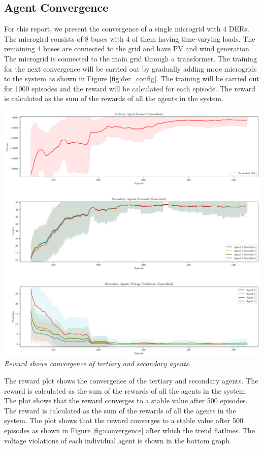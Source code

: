 \documentclass[11pt]{article}
\begin{document}
\subsection{Agent Convergence}
For this report, we present the convergence of a single microgrid with 4 DERs. The microgird consists of 8 buses with 4 of them having time-varying loads. The remaining 4 buses are connected to the grid and have PV and wind generation. The microgrid is connected to the main grid through a transformer.
The training for the next convergence will be carried out by gradually adding more microgrids to the system as shown in Figure \ref{fig:der_config}. The training will be carried out for 1000 episodes and the reward will be calculated for each episode. The reward is calculated as the sum of the rewards of all the agents in the system.

\includegraphics[width=0.9\linewidth]{./rewards_plot.png} 
\label{fig:convergence}
\textit{Reward shows convergence of tertiary and secondary agents.}

The reward plot shows the convergence of the tertiary and secondary agents. The reward is calculated as the sum of the rewards of all the agents in the system. The plot shows that the reward converges to a stable value after 500 episodes. The reward is calculated as the sum of the rewards of all the agents in the system. 
The plot shows that the reward converges to a stable value after 500 episodes as shown in Figure \ref{fig:convergence} after which the trend flatlines. The voltage violations of each individual agent is shown in the bottom graph.
\end{document}
